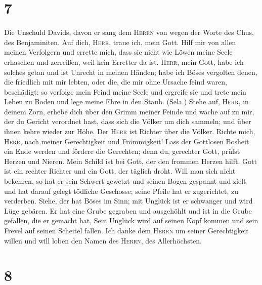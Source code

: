 \hypertarget{section-6}{%
\section{7}\label{section-6}}

 Die Unschuld Davids, davon er sang dem \textsc{Herrn} von
wegen der Worte des Chus, des Benjaminiten.  Auf dich,
\textsc{Herr}, traue ich, mein Gott. Hilf mir von allen meinen
Verfolgern und errette mich,  dass sie nicht wie Löwen
meine Seele erhaschen und zerreißen, weil kein Erretter da ist.
 \textsc{Herr}, mein Gott, habe ich solches getan und ist
Unrecht in meinen Händen;  habe ich Böses vergolten denen,
die friedlich mit mir lebten, oder die, die mir ohne Ursache feind
waren, beschädigt:  so verfolge mein Feind meine Seele und
ergreife sie und trete mein Leben zu Boden und lege meine Ehre in den
Staub. (Sela.)  Stehe auf, \textsc{Herr}, in deinem Zorn,
erhebe dich über den Grimm meiner Feinde und wache auf zu mir, der du
Gericht verordnet hast,  dass sich die Völker um dich
sammeln; und über ihnen kehre wieder zur Höhe.  Der
\textsc{Herr} ist Richter über die Völker. Richte mich, \textsc{Herr},
nach meiner Gerechtigkeit und Frömmigkeit!  Lass der
Gottlosen Bosheit ein Ende werden und fördere die Gerechten; denn du,
gerechter Gott, prüfst Herzen und Nieren.  Mein Schild
ist bei Gott, der den frommen Herzen hilft.  Gott ist ein
rechter Richter und ein Gott, der täglich droht.  Will
man sich nicht bekehren, so hat er sein Schwert gewetzt und seinen Bogen
gespannt und zielt  und hat darauf gelegt tödliche
Geschosse; seine Pfeile hat er zugerichtet, zu verderben.
 Siehe, der hat Böses im Sinn; mit Unglück ist er
schwanger und wird Lüge gebären.  Er hat eine Grube
gegraben und ausgehöhlt und ist in die Grube gefallen, die er gemacht
hat,  Sein Unglück wird auf seinen Kopf kommen und sein
Frevel auf seinen Scheitel fallen.  Ich danke dem
\textsc{Herrn} um seiner Gerechtigkeit willen und will loben den Namen
des \textsc{Herrn}, des Allerhöchsten.

\hypertarget{section-7}{%
\section{8}\label{section-7}}

